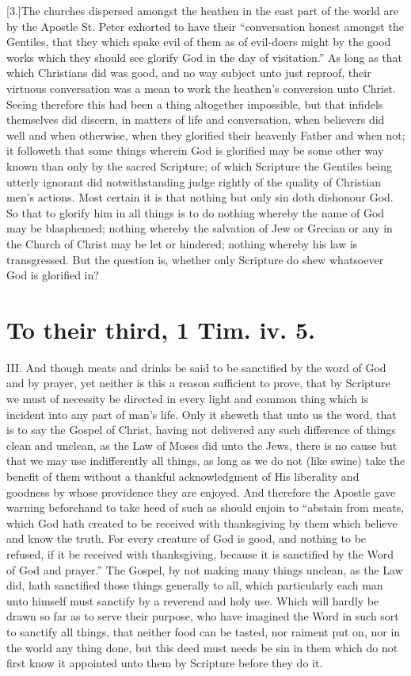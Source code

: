 [3.]The churches dispersed amongst the heathen in the east part of the world are by the Apostle St. Peter exhorted to have their “conversation honest amongst the Gentiles, that they which spake evil of them as of evil-doers might by the good works which they should see glorify God in the day of visitation.” As long as that which Christians did was good, and no way subject unto just reproof, their virtuous conversation was a mean to work the heathen’s conversion unto Christ. Seeing therefore this had been a thing altogether impossible, but that infidels themselves did discern, in matters of life and conversation, when believers did well and when otherwise, when they glorified their heavenly Father and when not; it followeth that some things wherein God is glorified may be some other way known than only by the sacred Scripture; of which Scripture the Gentiles being utterly ignorant did notwithstanding judge rightly of the quality of Christian men’s actions. Most certain it is that nothing but only sin doth dishonour God. So that to glorify him in all things is to do nothing whereby the name of God may be blasphemed; nothing whereby the salvation of Jew or Grecian or any in the Church of Christ may be let or hindered; nothing whereby his law is transgressed. But the question is, whether only Scripture do shew whatsoever God is glorified in?

\section*{To their third, 1 Tim. iv. 5.}

III. And though meats and drinks be said to be sanctified by the word of God and by prayer, yet neither is this a  reason sufficient to prove, that by Scripture we must of necessity be directed in every light and common thing which is incident into any part of man’s life. Only it sheweth that unto us the word, that is to say the Gospel of Christ, having not delivered any such difference of things clean and unclean, as the Law of Moses did unto the Jews, there is no cause but that we may use indifferently all things, as long as we do not (like swine) take the benefit of them without a thankful acknowledgment of His liberality and goodness by whose providence they are enjoyed. And therefore the Apostle gave warning beforehand to take heed of such as should enjoin to “abstain from meats, which God hath created to be received with thanksgiving by them which believe and know the truth. For every creature of God is good, and nothing to be refused, if it be received with thanksgiving, because it is sanctified by the Word of God and prayer.” The Gospel, by not making many things unclean, as the Law did, hath sanctified those things generally to all, which particularly each man unto himself must sanctify by a reverend and holy use. Which will hardly be drawn so far as to serve their purpose, who have imagined the Word in such sort to sanctify all things, that neither food can be tasted, nor raiment put on, nor in the world any thing done, but this deed must needs be sin in them which do not first know it appointed unto them by Scripture before they do it.

